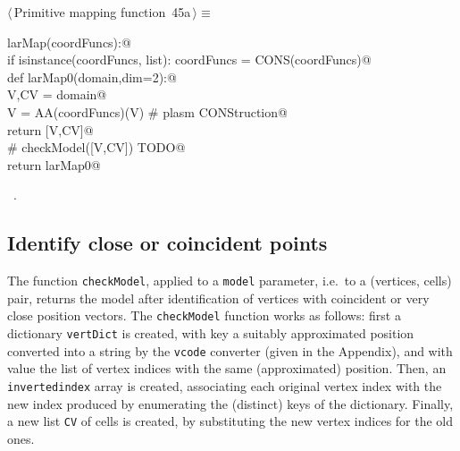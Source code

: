\documentclass[11pt,oneside]{article}    %
\begin{document}
\begin{flushleft} \small \label{scrap72}
\protect{}$\langle\,$Primitive mapping function\nobreak\ {\footnotesize 45a}$\,\rangle\equiv$
\vspace{-1ex}
\begin{list}{}{} \item
\mbox{}\verb@def larMap(coordFuncs):@\\
\mbox{}\verb@    if isinstance(coordFuncs, list): coordFuncs = CONS(coordFuncs)@\\
\mbox{}\verb@    def larMap0(domain,dim=2):@\\
\mbox{}\verb@        V,CV = domain@\\
\mbox{}\verb@        V = AA(coordFuncs)(V)  # plasm CONStruction@\\
\mbox{}\verb@        return [V,CV]@\\
\mbox{}\verb@        # checkModel([V,CV])  TODO@\\
\mbox{}\verb@    return larMap0@\\
\mbox{}\verb@@{\NWsep}
\end{list}
\vspace{-1ex}
\footnotesize\addtolength{\baselineskip}{-1ex}
\begin{list}{}{\setlength{\itemsep}{-\parsep}\setlength{\itemindent}{-\leftmargin}}
\item \NWtxtMacroRefIn\ .
\end{list}
\end{flushleft}

\subsection{Identify close or coincident points}

The function \texttt{checkModel}, applied to a \texttt{model} parameter, i.e.~to a (vertices, cells)  pair, returns the model after identification of vertices with coincident or very close position vectors.
The \texttt{checkModel} function works as follows: first a dictionary \texttt{vertDict} is created, with key a suitably approximated position converted into a string by the \texttt{vcode} converter (given in the Appendix), and with value the list of vertex indices with the same (approximated) position. Then, an \texttt{invertedindex} array is created, associating each original vertex index with the new index produced by enumerating the (distinct) keys of the dictionary. Finally, a new list \texttt{CV} of cells is created, by substituting the new vertex indices for the old ones. 
\end{document}
